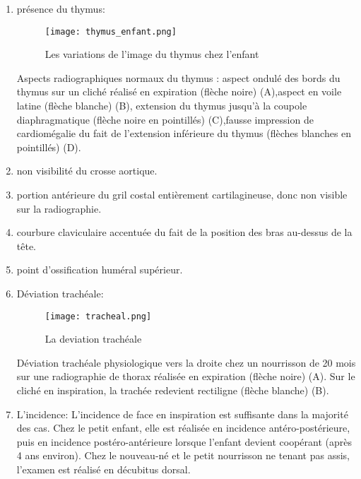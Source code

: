             \begin{enumerate}
                \item présence du thymus:
                \begin{figure}[H]
                    \centering
                    \texttt{[image: thymus\_enfant.png]}
                    \caption{Les variations de l’image du thymus chez l’enfant}\label{fig:thymus}
                \end{figure}
                Aspects radiographiques normaux du thymus : aspect ondulé des bords du thymus sur un cliché réalisé en expiration (flèche noire) (A),aspect en voile latine (flèche blanche) (B), extension du thymus jusqu'à la coupole diaphragmatique (flèche noire en pointillés) (C),fausse impression de cardiomégalie du fait de l'extension inférieure du thymus (flèches blanches en pointillés) (D).	
                \item non visibilité du crosse aortique.
                \item portion antérieure du gril costal entièrement cartilagineuse, donc non visible sur la radiographie.
                \item courbure claviculaire accentuée du fait de la position des bras au-dessus de la tête.
                \item point d'ossification huméral supérieur.
                \item Déviation trachéale:
                \begin{figure}[H]
                    \centering
                    \texttt{[image: tracheal.png]}
                    \caption{La deviation trachéale}\label{fig:tracheal}
                \end{figure}
                Déviation trachéale physiologique vers la droite chez un nourrisson de 20 mois sur une radiographie de thorax réalisée en expiration (flèche noire) (A). Sur le cliché en inspiration, la trachée redevient rectiligne (flèche blanche) (B).
                \item L'incidence:\newline
                L'incidence de face en inspiration est suffisante dans la majorité des cas.
                Chez le petit enfant, elle est réalisée en incidence antéro-postérieure, puis en incidence postéro-antérieure lorsque l'enfant devient coopérant (après 4 ans environ).
                Chez le nouveau-né et le petit nourrisson ne tenant pas assis, l'examen est réalisé en décubitus dorsal.

            \end{enumerate}

